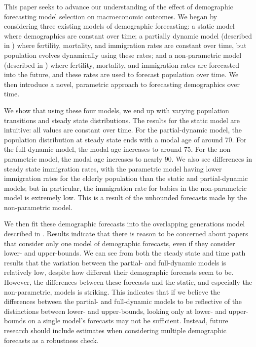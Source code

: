 \documentclass[10pt]{article}
\renewcommand{\thesection}{\arabic{section}}
\renewcommand{\section}[2][]{\oldsection[#1]{#2}\index{#1}\label{sec:\thesection}}
\numberwithin{equation}{subsection}
\begin{document}

\section{Conclusion}

\par This paper seeks to advance our understanding of the effect of demographic forecasting model selection on macroeconomic outcomes. We began by considering three existing models of demographic forecasting: a static model where demographics are constant over time; a partially dynamic model (described in \cite{DE2018}) where fertility, mortality, and immigration rates are constant over time, but population evolves dynamically using these rates; and a non-parametric model (described in \cite{alt_demo_paper}) where fertility, mortality, and immigration rates are forecasted into the future, and these rates are used to forecast population over time. We then introduce a novel, parametric approach to forecasting demographics over time.

\par We show that using these four models, we end up with varying population transitions and steady state distributions. The results for the static model are intuitive: all values are constant over time. For the partial-dynamic model, the population distribution at steady state ends with a modal age of around 70. For the full-dynamic model, the modal age increases to around 75. For the non-parametric model, the modal age increases to nearly 90. We also see differences in steady state immigration rates, with the parametric model having lower immigration rates for the elderly population than the static and partial-dynamic models; but in particular, the immigration rate for babies in the non-parametric model is extremely low. This is a result of the unbounded forecasts made by the non-parametric model.

\par We then fit these demographic forecasts into the overlapping generations model described in \cite{E2020}. Results indicate that there is reason to be concerned about papers that consider only one model of demographic forecasts, even if they consider lower- and upper-bounds. We can see from both the steady state and time path results that the variation between the partial- and full-dynamic models is relatively low, despite how different their demographic forecasts seem to be. However, the differences between these forecasts and the static, and especially the non-parametric, models is striking. This indicates that if we believe the differences between the partial- and full-dynamic models to be reflective of the distinctions between lower- and upper-bounds, looking only at lower- and upper-bounds on a single model's forecasts may not be sufficient. Instead, future research should include estimates when considering multiple demographic forecasts as a robustness check.
\end{document}
